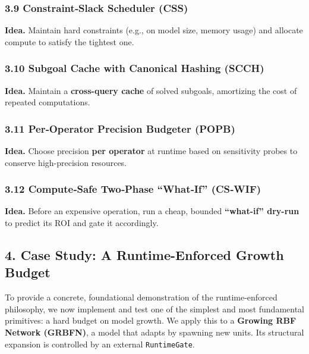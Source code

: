 \documentclass[
]{article}
\begin{document}
\hypertarget{constraintslack-scheduler-css}{%
\subsubsection{3.9 Constraint‑Slack Scheduler
(CSS)}\label{constraintslack-scheduler-css}}

\textbf{Idea.} Maintain hard constraints (e.g., on model size, memory
usage) and allocate compute to satisfy the tightest one.

\hypertarget{subgoal-cache-with-canonical-hashing-scch}{%
\subsubsection{3.10 Subgoal Cache with Canonical Hashing
(SCCH)}\label{subgoal-cache-with-canonical-hashing-scch}}

\textbf{Idea.} Maintain a \textbf{cross-query cache} of solved subgoals,
amortizing the cost of repeated computations.

\hypertarget{peroperator-precision-budgeter-popb}{%
\subsubsection{3.11 Per‑Operator Precision Budgeter
(POPB)}\label{peroperator-precision-budgeter-popb}}

\textbf{Idea.} Choose precision \textbf{per operator} at runtime based
on sensitivity probes to conserve high-precision resources.

\hypertarget{computesafe-twophase-whatif-cswif}{%
\subsubsection{3.12 Compute‑Safe Two‑Phase ``What‑If''
(CS‑WIF)}\label{computesafe-twophase-whatif-cswif}}

\textbf{Idea.} Before an expensive operation, run a cheap, bounded
\textbf{``what-if'' dry-run} to predict its ROI and gate it accordingly.

\hypertarget{case-study-a-runtime-enforced-growth-budget}{%
\subsection{4. Case Study: A Runtime-Enforced Growth
Budget}\label{case-study-a-runtime-enforced-growth-budget}}

To provide a concrete, foundational demonstration of the
runtime-enforced philosophy, we now implement and test one of the
simplest and most fundamental primitives: a hard budget on model growth.
We apply this to a \textbf{Growing RBF Network (GRBFN)}, a model that
adapts by spawning new units. Its structural expansion is controlled by
an external \texttt{RuntimeGate}.
\end{document}
